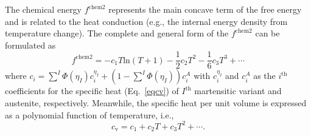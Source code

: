 \documentclass[reprint,3p,sort&compress,times,onecolumn]{elsarticle}
\begin{document}
The chemical energy $f^{\text{chem2}}$ represents the main concave term of the free energy and is related to the heat conduction (e.g., the internal energy density from temperature change). 
The complete and general form of the $f^{\text{chem2}}$ can be formulated as
\begin{equation}
f^{\text{chem2}}=-c_1 T\text{ln}(T+1)- \frac{1}{2} c_2T^2-\frac{1}{6}c_3T^3 + \cdots \label{eq-fchem2-improper}
\end{equation}
where $c_i=\sum^I \Phi(\eta_I) c_i^{\eta_I}+(1-\sum^I\Phi(\eta_I))c_i^A$ with $c_i^{\eta_I}$ and $c_i^A$ as the $i^\text{th}$ coefficients for the specific heat (Eq.~\ref{eqcv}) of $I^\text{th}$ martensitic variant and austenite, respectively.
Meanwhile, the specific heat per unit volume is expressed as a polynomial function of temperature, i.e.,
\begin{equation}
c_\text{v}  = c_1 + c_2 T + c_3 T^2 + \cdots .  \label{eqcv}
\end{equation}
\end{document}
